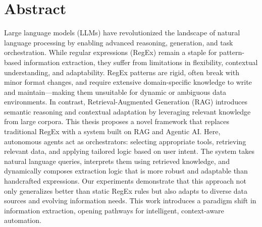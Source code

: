 
\chapter*{\centering Abstract}

Large language models (LLMs) have revolutionized the landscape of natural language processing by enabling advanced reasoning, generation, and task orchestration. While regular expressions (RegEx) remain a staple for pattern-based information extraction, they suffer from limitations in flexibility, contextual understanding, and adaptability. RegEx patterns are rigid, often break with minor format changes, and require extensive domain-specific knowledge to write and maintain—making them unsuitable for dynamic or ambiguous data environments. In contrast, Retrieval-Augmented Generation (RAG) introduces semantic reasoning and contextual adaptation by leveraging relevant knowledge from large corpora. This thesis proposes a novel framework that replaces traditional RegEx with a system built on RAG and Agentic AI. Here, autonomous agents act as orchestrators: selecting appropriate tools, retrieving relevant data, and applying tailored logic based on user intent. The system takes natural language queries, interprets them using retrieved knowledge, and dynamically composes extraction logic that is more robust and adaptable than handcrafted expressions. Our experiments demonstrate that this approach not only generalizes better than static RegEx rules but also adapts to diverse data sources and evolving information needs. This work introduces a paradigm shift in information extraction, opening pathways for intelligent, context-aware automation.
